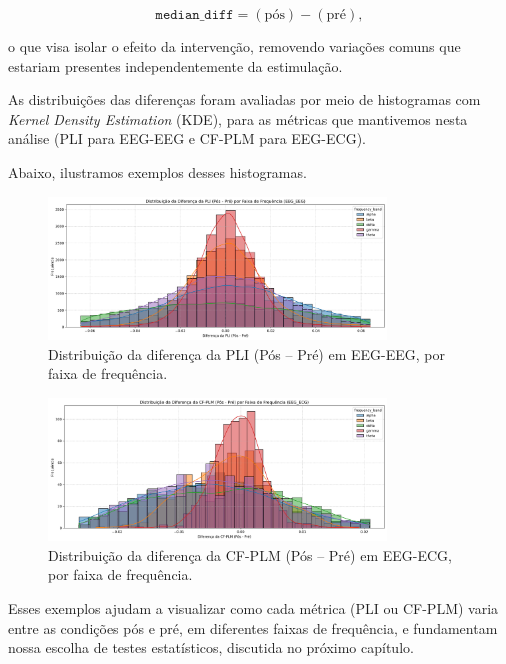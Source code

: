 \[
\texttt{median\_diff} = (\text{pós}) - (\text{pré}),
\]

o que visa isolar o efeito da intervenção, removendo variações comuns que estariam presentes independentemente da estimulação.

As distribuições das diferenças foram avaliadas por meio de histogramas com \emph{Kernel Density Estimation} (KDE), para as métricas que mantivemos nesta análise (PLI para EEG-EEG e CF-PLM para EEG-ECG).

Abaixo, ilustramos exemplos desses histogramas.

\begin{figure}[htb]
    \centering
    \includegraphics[width=0.8\textwidth]{figs/6_distribuicao_metricas_conectividade/Distribuição_da_Diferença_da_PLI_(Pós_-_Pré)_por_Faixa_de_Frequência_EEG_EEG.png}
    \caption{Distribuição da diferença da PLI (Pós -- Pré) em EEG-EEG, por faixa de frequência.}
    \label{fig:pli_freq_eeg_eeg}
\end{figure}

\begin{figure}[htb]
    \centering
    \includegraphics[width=0.8\textwidth]{figs/6_distribuicao_metricas_conectividade/Distribuição_da_Diferença_da_CF-PLM_(Pós_-_Pré)_por_Faixa_de_Frequência_EEG_ECG.png}
    \caption{Distribuição da diferença da CF-PLM (Pós -- Pré) em EEG-ECG, por faixa de frequência.}
    \label{fig:cf_plm_freq_eeg_ecg}
\end{figure}

Esses exemplos ajudam a visualizar como cada métrica (PLI ou CF-PLM) varia entre as condições pós e pré, em diferentes faixas de frequência, e fundamentam nossa escolha de testes estatísticos, discutida no próximo capítulo.

